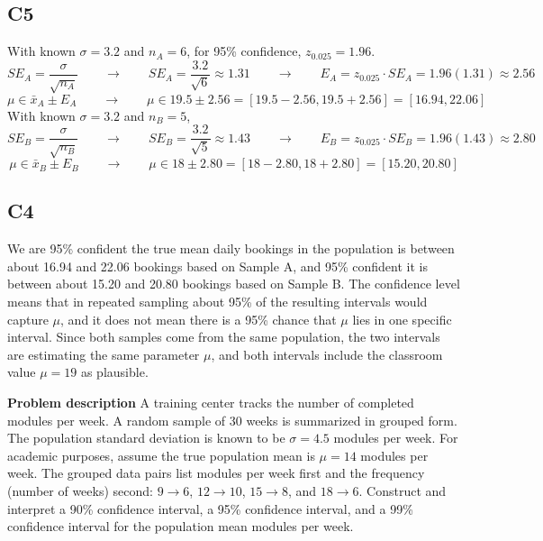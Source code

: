 \begin{ExamProblems}
		\subsection*{C5}
		With known $\sigma = 3.2$ and $n_A = 6$, for 95\% confidence, $z_{0.025}=1.96$.
		\[
		SE_A = \frac{\sigma}{\sqrt{n_A}}  \qquad \longrightarrow \qquad SE_A = \frac{3.2}{\sqrt{6}} \approx 1.31  \qquad \longrightarrow \qquad  E_A = z_{0.025} \cdot SE_A = 1.96(1.31) \approx 2.56
		\]
		\[
		\mu \in \bar{x}_A \pm E_A  \qquad \longrightarrow \qquad \mu \in 19.5 \pm 2.56 = [19.5 - 2.56, 19.5 + 2.56] = [16.94, 22.06]
		\]
		With known $\sigma = 3.2$ and $n_B = 5$,
		\[
		SE_B = \frac{\sigma}{\sqrt{n_B}}  \qquad \longrightarrow \qquad SE_B = \frac{3.2}{\sqrt{5}} \approx 1.43  \qquad \longrightarrow \qquad  E_B = z_{0.025} \cdot SE_B = 1.96(1.43) \approx 2.80
		\]
		\[
		\mu \in \bar{x}_B \pm E_B   \qquad \longrightarrow \qquad \mu \in 18 \pm 2.80 = [18 - 2.80, 18 + 2.80] = [15.20, 20.80]
		\]

		\subsection*{C4}
		We are 95\% confident the true mean daily bookings in the population is between about 16.94 and 22.06 bookings based on Sample A, and 95\% confident it is between about 15.20 and 20.80 bookings based on Sample B. The confidence level means that in repeated sampling about 95\% of the resulting intervals would capture $\mu$, and it does not mean there is a 95\% chance that $\mu$ lies in one specific interval. Since both samples come from the same population, the two intervals are estimating the same parameter $\mu$, and both intervals include the classroom value $\mu = 19$ as plausible.

		\newpage
		\item
		\textbf{Problem description}
		A training center tracks the number of completed modules per week.
		A random sample of 30 weeks is summarized in grouped form. The population standard deviation is known to be \(\sigma = 4.5\) modules per week.
		For academic purposes, assume the true population mean is \(\mu = 14\) modules per week.
		The grouped data pairs list modules per week first and the frequency (number of weeks) second: \(9 \rightarrow 6\), \(12 \rightarrow 10\), \(15 \rightarrow 8\), and \(18 \rightarrow 6\).
		Construct and interpret a 90\% confidence interval, a 95\% confidence interval, and a 99\% confidence interval for the population mean modules per week.


\end{ExamProblems}
